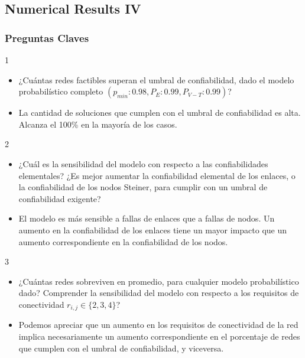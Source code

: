 \subsection{Numerical Results IV}
\begin{frame} \frametitle{Preguntas Claves}
\begin{tiny}
\begin{block} {1}
 	 \begin{itemize}
 	 	\item ¿Cuántas redes factibles superan el umbral de confiabilidad, dado el modelo probabilístico completo $(p_{min}:0.98,P_E:0.99,P_{V-T}:0.99)$?
 	 	\item La cantidad de soluciones que cumplen con el umbral de confiabilidad es alta. Alcanza el 100\% en la mayoría de los casos.
 	 \end{itemize}  
 \end{block} 	   
 \begin{block} {2}
 	 \begin{itemize}
 	 	\item ¿Cuál es la sensibilidad del modelo con respecto a las confiabilidades elementales? ¿Es mejor aumentar la confiabilidad elemental de los enlaces, o la confiabilidad de los nodos Steiner, para cumplir con un umbral de confiabilidad exigente?
 	 	\item El modelo es más sensible a fallas de enlaces que a fallas de nodos. Un aumento en la confiabilidad de los enlaces tiene un mayor impacto que un aumento correspondiente en la confiabilidad de los nodos.
 	 \end{itemize}  
 \end{block} 	
  \begin{block} {3}
 	 \begin{itemize}
 	 	\item ¿Cuántas redes sobreviven en promedio, para cualquier modelo probabilístico dado? Comprender la sensibilidad del modelo con respecto a los requisitos de conectividad $r_{i,j} \in \{2,3,4\}$?
 	 	\item Podemos apreciar que un aumento en los requisitos de conectividad de la red implica necesariamente un aumento correspondiente en el porcentaje de redes que cumplen con el umbral de confiabilidad, y viceversa.
 	 \end{itemize}  
 \end{block} 	
 \end{tiny}
\end{frame}


